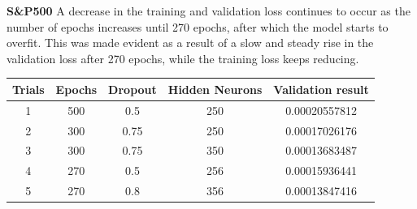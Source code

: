 \documentclass[a4paper,11pt,oneside]{book}
\begin{document}
 
 \textbf{S\&P500}\newline\newline
A decrease in the training and validation loss continues to occur as the number of epochs increases until 270
epochs, after which the model starts to overfit. This was made evident as a result of a slow and steady rise
in the validation loss after 270 epochs, while the training loss keeps reducing.

\begin{center}
	\begin{tabular}{||c c c c c||} 
		\hline
		Trials & Epochs & Dropout & Hidden Neurons & Validation result\\ [0.5ex] 
		\hline\hline
		1 & 500 & 0.5 & 250 & 0.00020557812 \\ 
		\hline
		2 & 300 & 0.75 & 250 & 0.00017026176 \\
		\hline
		3 & 300 & 0.75 & 350 & 0.00013683487 \\
		\hline
		4 & 270 & 0.5 & 256 & 0.00015936441 \\
		\hline
		5 & 270 & 0.8 & 356 & 0.00013847416 \\ [1ex] 
		\hline
	\end{tabular}
\end{center}
\end{document}
